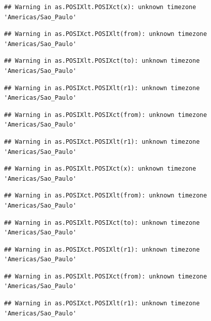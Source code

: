 \documentclass[]{book}
\theoremstyle{definition}
\theoremstyle{definition}
\theoremstyle{definition}
\theoremstyle{remark}
\begin{document}
\begin{verbatim}
## Warning in as.POSIXlt.POSIXct(x): unknown timezone 'Americas/Sao_Paulo'
\end{verbatim}

\begin{verbatim}
## Warning in as.POSIXct.POSIXlt(from): unknown timezone 'Americas/Sao_Paulo'
\end{verbatim}

\begin{verbatim}
## Warning in as.POSIXlt.POSIXct(to): unknown timezone 'Americas/Sao_Paulo'
\end{verbatim}

\begin{verbatim}
## Warning in as.POSIXct.POSIXlt(r1): unknown timezone 'Americas/Sao_Paulo'
\end{verbatim}

\begin{verbatim}
## Warning in as.POSIXlt.POSIXct(from): unknown timezone 'Americas/Sao_Paulo'
\end{verbatim}

\begin{verbatim}
## Warning in as.POSIXct.POSIXlt(r1): unknown timezone 'Americas/Sao_Paulo'
\end{verbatim}

\begin{verbatim}
## Warning in as.POSIXlt.POSIXct(x): unknown timezone 'Americas/Sao_Paulo'
\end{verbatim}

\begin{verbatim}
## Warning in as.POSIXct.POSIXlt(from): unknown timezone 'Americas/Sao_Paulo'
\end{verbatim}

\begin{verbatim}
## Warning in as.POSIXlt.POSIXct(to): unknown timezone 'Americas/Sao_Paulo'
\end{verbatim}

\begin{verbatim}
## Warning in as.POSIXct.POSIXlt(r1): unknown timezone 'Americas/Sao_Paulo'
\end{verbatim}

\begin{verbatim}
## Warning in as.POSIXlt.POSIXct(from): unknown timezone 'Americas/Sao_Paulo'
\end{verbatim}

\begin{verbatim}
## Warning in as.POSIXct.POSIXlt(r1): unknown timezone 'Americas/Sao_Paulo'
\end{verbatim}
\end{document}
